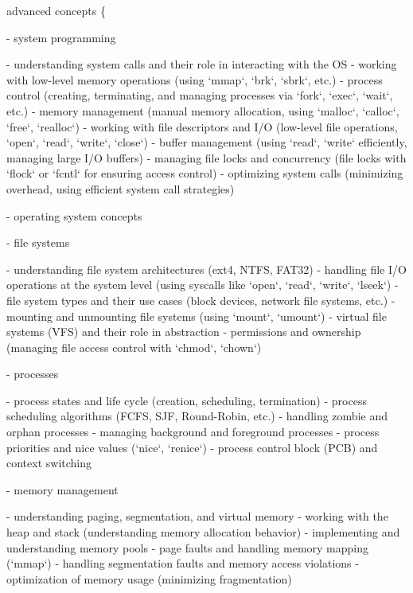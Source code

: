 advanced concepts \{ \begin{DoxyVerb}- system programming {

    - understanding system calls and their role in interacting with the OS
    - working with low-level memory operations (using `mmap`, `brk`, `sbrk`, etc.)
    - process control (creating, terminating, and managing processes via `fork`, `exec`, `wait`, etc.)
    - memory management (manual memory allocation, using `malloc`, `calloc`, `free`, `realloc`)
    - working with file descriptors and I/O (low-level file operations, `open`, `read`, `write`, `close`)
    - buffer management (using `read`, `write` efficiently, managing large I/O buffers)
    - managing file locks and concurrency (file locks with `flock` or `fcntl` for ensuring access control)
    - optimizing system calls (minimizing overhead, using efficient system call strategies)

}

- operating system concepts {

    - file systems {

        - understanding file system architectures (ext4, NTFS, FAT32)
        - handling file I/O operations at the system level (using syscalls like `open`, `read`, `write`, `lseek`)
        - file system types and their use cases (block devices, network file systems, etc.)
        - mounting and unmounting file systems (using `mount`, `umount`)
        - virtual file systems (VFS) and their role in abstraction
        - permissions and ownership (managing file access control with `chmod`, `chown`)

    }

    - processes {

        - process states and life cycle (creation, scheduling, termination)
        - process scheduling algorithms (FCFS, SJF, Round-Robin, etc.)
        - handling zombie and orphan processes
        - managing background and foreground processes
        - process priorities and nice values (`nice`, `renice`)
        - process control block (PCB) and context switching

    }

    - memory management {

        - understanding paging, segmentation, and virtual memory
        - working with the heap and stack (understanding memory allocation behavior)
        - implementing and understanding memory pools
        - page faults and handling memory mapping (`mmap`)
        - handling segmentation faults and memory access violations
        - optimization of memory usage (minimizing fragmentation)

}}
\end{DoxyVerb}
